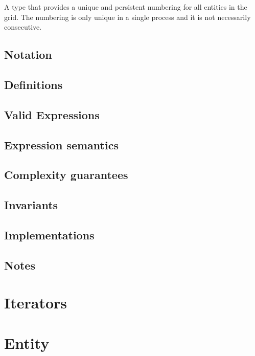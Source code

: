 \documentclass[11pt,a4paper,headinclude,footinclude,DIV14,BCOR8.25mm,titlepage,twoside,openright,normalheadings]{scrreprt}
\begin{document}
A type that provides a unique and persistent numbering for
all entities in the grid. The numbering is only unique in a single process
and it is not necessarily consecutive.  



\subsection{Notation}

\subsection{Definitions}

\subsection{Valid Expressions}

\subsection{Expression semantics}

\subsection{Complexity guarantees}

\subsection{Invariants}

\subsection{Implementations}

\subsection{Notes}


\section{Iterators}

\section{Entity}
\end{document}
